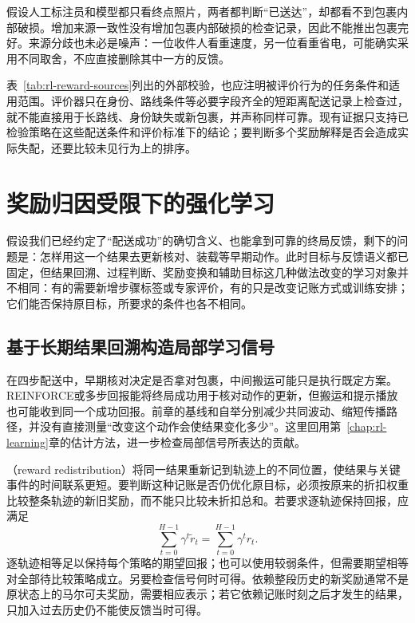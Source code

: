 假设人工标注员和模型都只看终点照片，两者都判断“已送达”，却都看不到包裹内部破损。增加来源一致性没有增加包裹内部破损的检查记录，因此不能推出包裹完好。来源分歧也未必是噪声：一位收件人看重速度，另一位看重省电，可能确实采用不同取舍，不应直接删除其中一方的反馈。

表~\ref{tab:rl-reward-sources}列出的外部校验，也应注明被评价行为的任务条件和适用范围。评价器只在身份、路线条件等必要字段齐全的短距离配送记录上检查过，就不能直接用于长路线、身份缺失或新包裹，并声称同样可靠。现有证据只支持已检验策略在这些配送条件和评价标准下的结论；要判断多个奖励解释是否会造成实际失配，还要比较未见行为上的排序。

\section{奖励归因受限下的强化学习}
\label{sec:rl-reward-credit}

假设我们已经约定了“配送成功”的确切含义、也能拿到可靠的终局反馈，剩下的问题是：怎样用这一个结果去更新核对、装载等早期动作。此时目标与反馈语义都已固定，但结果回溯、过程判断、奖励变换和辅助目标这几种做法改变的学习对象并不相同：有的需要新增步骤标签或专家评价，有的只是改变记账方式或训练安排；它们能否保持原目标，所要求的条件也各不相同。

\subsection{基于长期结果回溯构造局部学习信号}
\label{sec:rl-reward-redistribution}

在四步配送中，早期核对决定是否拿对包裹，中间搬运可能只是执行既定方案。REINFORCE或多步回报能将终局成功用于核对动作的更新，但搬运和提示播放也可能收到同一个成功回报。前章的基线和自举分别减少共同波动、缩短传播路径，并没有直接测量“改变这个动作会使结果变化多少”。这里回用第~\ref{chap:rl-learning}章的估计方法，进一步检查局部信号所表达的贡献。

（reward redistribution）将同一结果重新记到轨迹上的不同位置，使结果与关键事件的时间联系更短。要判断这种记账是否仍优化原目标，必须按原来的折扣权重比较整条轨迹的新旧奖励，而不能只比较未折扣总和。若要求逐轨迹保持回报，应满足
\begin{equation}
  \sum_{t=0}^{H-1}\gamma^t\widetilde r_t
    =\sum_{t=0}^{H-1}\gamma^t r_t.
  \label{eq:rl-reward-redistribution}
\end{equation}
逐轨迹相等足以保持每个策略的期望回报；也可以使用较弱条件，但需要期望相等对全部待比较策略成立。另要检查信号何时可得。依赖整段历史的新奖励通常不是原状态上的马尔可夫奖励，需要相应表示；若它依赖记账时刻之后才发生的结果，只加入过去历史仍不能使反馈当时可得。

